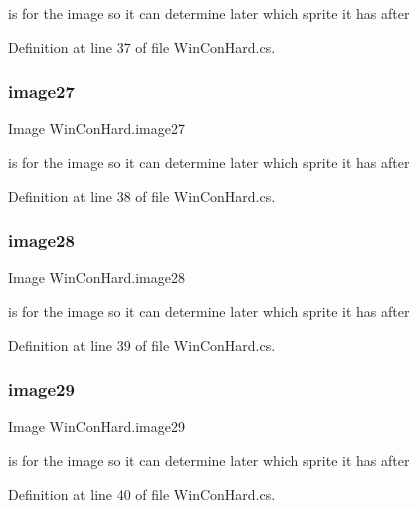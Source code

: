 is for the image so it can determine later which sprite it has after 

Definition at line 37 of file Win\+Con\+Hard.\+cs.

\mbox{\label{class_win_con_hard_a64bc5e6fc0e9e72818a5ccd86a698636}} 
\subsubsection{\texorpdfstring{image27}{image27}}
{\footnotesize\ttfamily Image Win\+Con\+Hard.\+image27}

is for the image so it can determine later which sprite it has after 

Definition at line 38 of file Win\+Con\+Hard.\+cs.

\mbox{\label{class_win_con_hard_af149d36232a45765290df741425bea89}} 
\subsubsection{\texorpdfstring{image28}{image28}}
{\footnotesize\ttfamily Image Win\+Con\+Hard.\+image28}

is for the image so it can determine later which sprite it has after 

Definition at line 39 of file Win\+Con\+Hard.\+cs.

\mbox{\label{class_win_con_hard_a6abd22d18016f6592e901fb5b489d54d}} 
\subsubsection{\texorpdfstring{image29}{image29}}
{\footnotesize\ttfamily Image Win\+Con\+Hard.\+image29}

is for the image so it can determine later which sprite it has after 

Definition at line 40 of file Win\+Con\+Hard.\+cs.

\mbox{\label{class_win_con_hard_aac8d99111f9005e76859f9254999804a}} 
